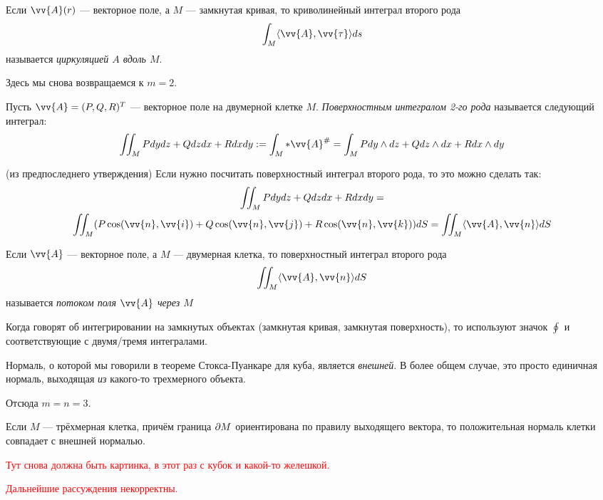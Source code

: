 \begin{definition}
	Если $\vv{A}(r)$ --- векторное поле, а $M$ --- замкнутая кривая, то криволинейный интеграл второго рода
	\[
		\int_M \ntbr{\vv{A}, \vv{\tau}}ds
	\]
	называется \textit{циркуляцией $A$ вдоль $M$}.
\end{definition}

\begin{note}
	Здесь мы снова возвращаемся к $m = 2$.
\end{note}

\begin{definition}
	Пусть $\vv{A} = (P, Q, R)^T$ --- векторное поле на двумерной клетке $M$. \textit{Поверхностным интегралом 2-го рода} называется следующий интеграл:
	\[
	\iint_M Pdydz + Qdzdx + Rdxdy := \int_M *\vv{A}^\# = \int_M Pdy \wedge dz + Q dz \wedge dx + Rdx \wedge dy
	\]
\end{definition}

\begin{corollary} (из предпоследнего утверждения)
	Если нужно посчитать поверхностный интеграл второго рода, то это можно сделать так:
	\begin{multline*}
	\iint_M Pdydz + Qdzdx + Rdxdy =
	\\
	\iint_M (P\cos(\vv{n}, \vv{i}) + Q\cos(\vv{n}, \vv{j}) + R\cos(\vv{n}, \vv{k}))dS = \iint_M \ntbr{\vv{A}, \vv{n}}dS
	\end{multline*}
\end{corollary}

\begin{definition}
	Если $\vv{A}$ --- векторное поле, а $M$ --- двумерная клетка, то поверхностный интеграл второго рода
	\[
	\iint_M \ntbr{\vv{A}, \vv{n}}dS
	\]
	называется \textit{потоком поля $\vv{A}$ через $M$}
\end{definition}

\begin{anote}
	Когда говорят об интегрировании на замкнутых объектах (замкнутая кривая, замкнутая поверхность), то используют значок $\oint$ и соответствующие с двумя/тремя интегралами.
\end{anote}

\begin{reminder}
	Нормаль, о которой мы говорили в теореме Стокса-Пуанкаре для куба, является \textit{внешней}. В более общем случае, это просто единичная нормаль, выходящая \textit{из} какого-то трехмерного объекта.
\end{reminder}

\begin{note}
	Отсюда $m = n = 3$.
\end{note}

\begin{lemma}
	Если $M$ --- трёхмерная клетка, причём граница $\partial M$ ориентирована по правилу выходящего вектора, то положительная нормаль клетки совпадает с внешней нормалью.
\end{lemma}

\textcolor{red}{Тут снова должна быть картинка, в этот раз с кубок и какой-то желешкой.}

\textcolor{red}{Дальнейшие рассуждения некорректны.}
